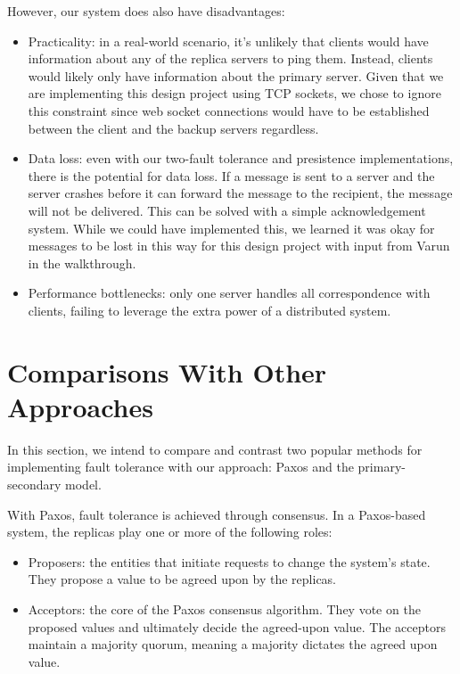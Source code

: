 \documentclass[
	a4paper, %
	10pt, %
	unnumberedsections, %
	twoside, %
]{LTJournalArticle}
\begin{document}
However, our system does also have disadvantages: 
\begin{itemize}
    \item Practicality: in a real-world scenario, it's unlikely that clients would have information about any of the replica servers to ping them. Instead, clients would likely only have information about the primary server. Given that we are implementing this design project using TCP sockets, we chose to ignore this constraint since web socket connections would have to be established between the client and the backup servers regardless. 
    \item Data loss: even with our two-fault tolerance and presistence implementations, there is the potential for data loss. If a message is sent to a server and the server crashes before it can forward the message to the recipient, the message will not be delivered. This can be solved with a simple acknowledgement system. While we could have implemented this, we learned it was okay for messages to be lost in this way for this design project with input from Varun in the walkthrough. 
    \item Performance bottlenecks: only one server handles all correspondence with clients, failing to leverage the extra power of a distributed system. 
\end{itemize}

\section{Comparisons With Other Approaches}

In this section, we intend to compare and contrast two popular methods for implementing fault tolerance with our approach: Paxos and the primary-secondary model. 

With Paxos, fault tolerance is achieved through consensus. In a Paxos-based system, the replicas play one or more of the following roles:

\begin{itemize}
    \item Proposers: the entities that initiate requests to change the system's state. They propose a value to be agreed upon by the replicas. 
    \item Acceptors: the core of the Paxos consensus algorithm. They vote on the proposed values and ultimately decide the agreed-upon value. The acceptors maintain a majority quorum, meaning a majority dictates the agreed upon value. 
\end{itemize}
\end{document}
